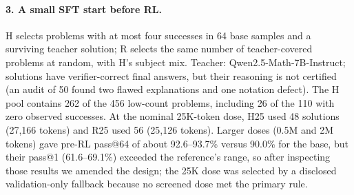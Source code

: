 \documentclass[11pt]{article}
\begin{document}
\begin{table}[h]
\centering\small
\caption{Descriptive checkpoint-average gaps at matched pass@1 (first 32 samples per problem; 90\% bootstrap
intervals for the SFT rows). pass@16 and pass@2 gaps are in percentage points; distinct wrong classes are counts;
collision differences are in probability units. Two of the RL rows (HGm, PG) use two seeds; others use three. SFT
rows cover eligible checkpoints through step 50; R25's registered contrast was not interpreted (support).}
\label{tab:decomp}
\end{table}

\paragraph{3. A small SFT start before RL.}
H selects problems with at most four successes in 64 base samples and a surviving teacher solution; R selects the same
number of teacher-covered problems at random, with H's subject mix. Teacher: Qwen2.5-Math-7B-Instruct; solutions have
verifier-correct final answers, but their reasoning is not certified (an audit of 50 found two flawed explanations
and one notation defect). The H pool contains 262 of the 456 low-count problems, including 26 of the 110 with zero
observed successes. At the nominal 25K-token dose, H25 used 48 solutions (27,166 tokens) and R25 used 56 (25,126
tokens). Larger doses (0.5M and 2M tokens) gave pre-RL pass@64 of about 92.6--93.7\% versus 90.0\% for the base, but
their pass@1 (61.6--69.1\%) exceeded the reference's range, so after inspecting those results we amended the design;
the 25K dose was selected by a disclosed validation-only fallback because no screened dose met the primary rule.
\end{document}
